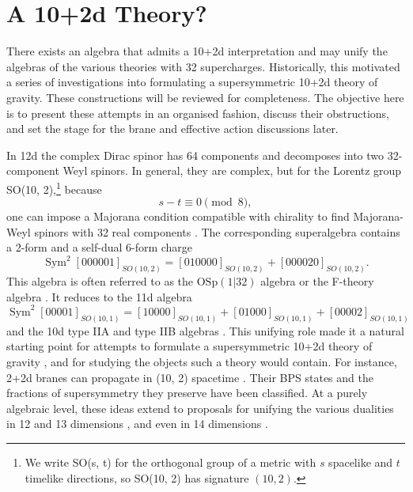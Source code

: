 \section{A 10+2d Theory?}\label{sec:12d-supergravity-attempts}
There exists an algebra that admits a 10+2d interpretation and may unify the algebras of the various theories with 32 supercharges. 
Historically, this motivated a series of investigations into formulating a supersymmetric 10+2d theory of gravity.
These constructions will be reviewed for completeness.
The objective here is to present these attempts in an organised fashion, discuss their obstructions, and set the stage for the brane and effective action discussions later.

In 12d the complex Dirac spinor has 64 components and decomposes into two 32-component Weyl spinors.
In general, they are complex, but for the Lorentz group SO(10, 2),\footnote{We write SO(s, t) for the orthogonal group of a metric with $s$ spacelike and $t$ timelike directions, so SO(10, 2) has signature $(10, 2)$.} because
\begin{equation}
s-t\equiv 0 \pmod 8,
\end{equation}
one can impose a Majorana condition compatible with chirality to find Majorana-Weyl spinors with 32 real components \cite{VanProeyen:1999ni}.
The corresponding superalgebra contains a 2-form and a self-dual 6-form charge
\cite{vanHolten:1982mx}
\begin{equation}
\operatorname{Sym}^2[000001]_{SO(10, 2)} = [010000]_{SO(10, 2)} + [000020]_{SO(10, 2)}.
\label{OSp algebra}
\end{equation}
This algebra is often referred to as the $\mathrm{OSp}(1|32)$ algebra \cite{Bergshoeff:2000qu} or the F-theory algebra \cite{Hewson:1999tf}.
It reduces to the 11d algebra
\begin{equation}
\operatorname{Sym}^2[00001]_{SO(10, 1)} = [10000]_{SO(10, 1)} + [01000]_{SO(10, 1)} + [00002]_{SO(10, 1)}
\end{equation}
and the 10d type IIA and type IIB algebras \cite{Bergshoeff:2000qu,Bergshoeff:2000vg,Bergshoeff:2000vh}.
This unifying role made it a natural starting point for attempts to formulate a supersymmetric 10+2d theory of gravity \cite{Castellani:1982ke}, and for studying the objects such a theory would contain. 
For instance, 2+2d branes can propagate in (10, 2) spacetime \cite{Blencowe:1988sk}. 
Their BPS states \cite{Ueno:1999xa} and the fractions of supersymmetry they preserve \cite{Manvelyan:1998kx} have been classified. 
At a purely algebraic level, these ideas extend to proposals for unifying the various dualities in 12 and 13 dimensions \cite{Bars:1996dz,Bars:1996us,Bars:1996ab,Bars:1996hr}, and even in 14 dimensions \cite{Rudychev:1997ui,Bars:1997ug}.

